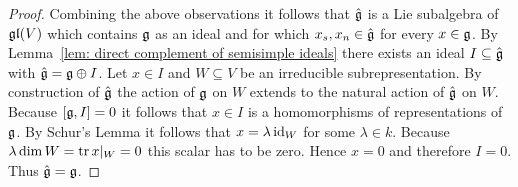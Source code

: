 \begin{proof}
 Combining the above observations it follows that $\hat{\mathfrak{g}}$ is a Lie subalgebra of $\mathfrak{gl}(V)$ which contains $\mathfrak{g}$ as an ideal and for which $x_s, x_n \in \hat{\mathfrak{g}}$ for every $x \in \mathfrak{g}$. By Lemma~\ref{lem: direct complement of semisimple ideals} there exists an ideal $I \subseteq \hat{\mathfrak{g}}$ with $\hat{\mathfrak{g}} = \mathfrak{g} \oplus I$. Let $x \in I$ and $W \subseteq V$ be an irreducible subrepresentation. By construction of $\hat{\mathfrak{g}}$ the action of $\mathfrak{g}$ on $W$ extends to the natural action of $\hat{\mathfrak{g}}$ on $W$. Because $[\mathfrak{g},I] = 0$ it follows that $x \in I$ is a homomorphisms of representations of $\mathfrak{g}$. By Schur’s Lemma it follows that $x = \lambda \operatorname{id}_W$ for some $\lambda \in k$. Because $\lambda \dim W = \operatorname{tr} x|_W = 0$ this scalar has to be zero. Hence $x = 0$ and therefore $I = 0$. Thus $\hat{\mathfrak{g}} = \mathfrak{g}$.
\end{proof}


